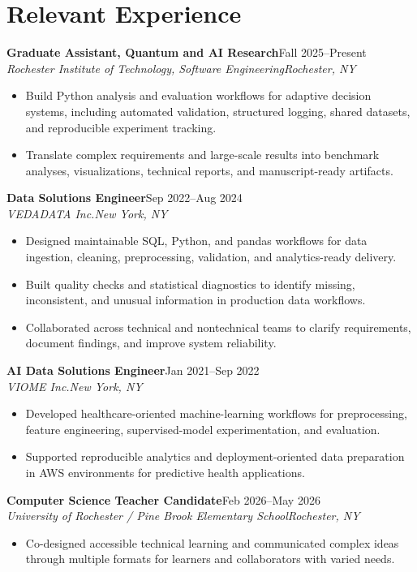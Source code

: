 \documentclass[10pt,letterpaper]{article}
\newcommand{\role}[4]{%
  \textbf{#1}\hfill #2\\
  \textit{#3}\hfill \textit{#4}\vspace{-3pt}
}
\begin{document}
\section*{Relevant Experience}
\role{Graduate Assistant, Quantum and AI Research}{Fall 2025--Present}
{Rochester Institute of Technology, Software Engineering}{Rochester, NY}
\begin{itemize}
  \item Build Python analysis and evaluation workflows for adaptive decision systems,
    including automated validation, structured logging, shared datasets, and
    reproducible experiment tracking.
  \item Translate complex requirements and large-scale results into benchmark
    analyses, visualizations, technical reports, and manuscript-ready artifacts.
\end{itemize}

\role{Data Solutions Engineer}{Sep 2022--Aug 2024}
{VEDADATA Inc.}{New York, NY}
\begin{itemize}
  \item Designed maintainable SQL, Python, and pandas workflows for data ingestion,
    cleaning, preprocessing, validation, and analytics-ready delivery.
  \item Built quality checks and statistical diagnostics to identify missing,
    inconsistent, and unusual information in production data workflows.
  \item Collaborated across technical and nontechnical teams to clarify
    requirements, document findings, and improve system reliability.
\end{itemize}

\role{AI Data Solutions Engineer}{Jan 2021--Sep 2022}
{VIOME Inc.}{New York, NY}
\begin{itemize}
  \item Developed healthcare-oriented machine-learning workflows for
    preprocessing, feature engineering, supervised-model experimentation, and
    evaluation.
  \item Supported reproducible analytics and deployment-oriented data
    preparation in AWS environments for predictive health applications.
\end{itemize}

\role{Computer Science Teacher Candidate}{Feb 2026--May 2026}
{University of Rochester / Pine Brook Elementary School}{Rochester, NY}
\begin{itemize}
  \item Co-designed accessible technical learning and communicated complex
    ideas through multiple formats for learners and collaborators with varied needs.
\end{itemize}
\end{document}
